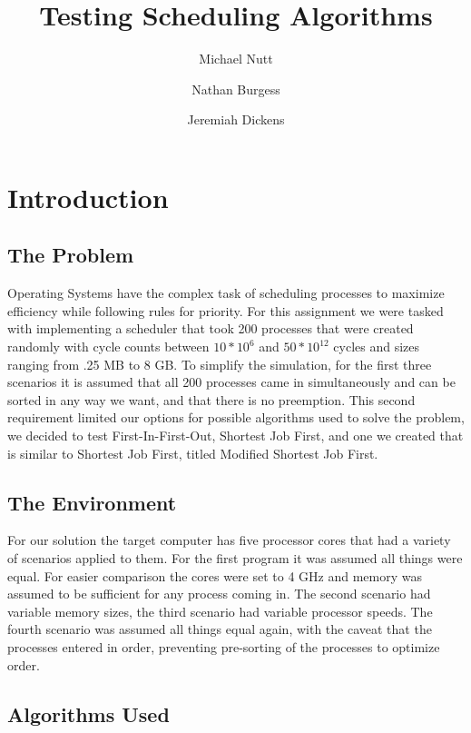 \documentclass[12pt]{article}
\title{Testing Scheduling Algorithms}
\author{
  Michael Nutt
  \and
  Nathan Burgess
  \and
  Jeremiah Dickens
}
\date{}
\begin{document}
\maketitle
{}
\newpage
{}
\tableofcontents
\newpage
{}

\section{Introduction}

  \subsection{The Problem}

  Operating Systems have the complex task of scheduling processes to maximize efficiency while following rules for priority. For this assignment we were tasked with implementing a scheduler that took 200 processes that were created randomly with cycle counts between $10*10^{6}$ and $50*10^{12}$ cycles and sizes ranging from .25 MB to 8 GB. To simplify the simulation, for the first three scenarios it is assumed that all 200 processes came in simultaneously and can be sorted in any way we want, and that there is no preemption. This second requirement limited our options for possible algorithms used to solve the problem, we decided to test First-In-First-Out, Shortest Job First, and one we created that is similar to Shortest Job First, titled Modified Shortest Job First.

  \subsection{The Environment}

  For our solution the target computer has five processor cores that had a variety of scenarios applied to them. For the first program it was assumed all things were equal. For easier comparison the cores were set to 4 GHz and memory was assumed to be sufficient for any process coming in. The second scenario had variable memory sizes, the third scenario had variable processor speeds. The fourth scenario was assumed all things equal again, with the caveat that the processes entered in order, preventing pre-sorting of the processes to optimize order.

  \subsection{Algorithms Used}
\end{document}
